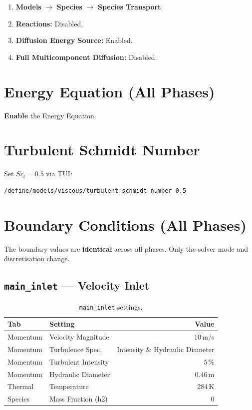 \documentclass[12pt,a4paper]{report}
\begin{document}
\begin{enumerate}
  \item \textbf{Models} $\rightarrow$ \textbf{Species} $\rightarrow$
        \textbf{Species Transport}.
  \item \textbf{Reactions:} Disabled.
  \item \textbf{Diffusion Energy Source:} Enabled.
  \item \textbf{Full Multicomponent Diffusion:} Disabled.
\end{enumerate}


\section{Energy Equation (All Phases)}

\textbf{Enable} the Energy Equation.

\section{Turbulent Schmidt Number}

Set $Sc_t = 0.5$ via TUI:

\begin{lstlisting}[language={},numbers=none]
/define/models/viscous/turbulent-schmidt-number 0.5
\end{lstlisting}


\section{Boundary Conditions (All Phases)}

The boundary values are \textbf{identical} across all phases.  Only
the solver mode and discretisation change.

\subsection{\texttt{main\_inlet} --- Velocity Inlet}

\begin{table}[H]
\centering
\caption{\texttt{main\_inlet} settings.}
\begin{tabular}{@{}llr@{}}
\toprule
\textbf{Tab} & \textbf{Setting} & \textbf{Value} \\
\midrule
Momentum & Velocity Magnitude     & 10\,m/s \\
Momentum & Turbulence Spec.       & Intensity \& Hydraulic Diameter \\
Momentum & Turbulent Intensity    & 5\,\% \\
Momentum & Hydraulic Diameter     & 0.46\,m \\
Thermal  & Temperature            & 284\,K \\
Species  & Mass Fraction (h2)     & 0 \\
\bottomrule
\end{tabular}
\end{table}
\end{document}
